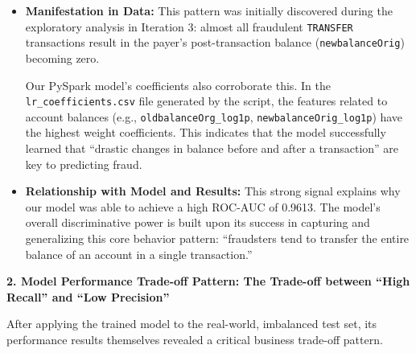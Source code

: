 \documentclass[sigplan,screen]{acmart}
\begin{document}
\begin{itemize}
\item \textbf{Manifestation in Data:} This pattern was initially discovered during the exploratory analysis in Iteration 3: almost all fraudulent \texttt{TRANSFER} transactions result in the payer's post-transaction balance (\texttt{newbalanceOrig}) becoming zero.

Our PySpark model's coefficients also corroborate this. In the \texttt{lr\_coefficients.csv} file generated by the script, the features related to account balances (e.g., \texttt{oldbalanceOrg\_log1p}, \texttt{newbalanceOrig\_log1p}) have the highest weight coefficients. This indicates that the model successfully learned that ``drastic changes in balance before and after a transaction'' are key to predicting fraud.

\item \textbf{Relationship with Model and Results:} This strong signal explains why our model was able to achieve a high ROC-AUC of 0.9613. The model's overall discriminative power is built upon its success in capturing and generalizing this core behavior pattern: ``fraudsters tend to transfer the entire balance of an account in a single transaction.''
\end{itemize}

\textbf{2. Model Performance Trade-off Pattern: The Trade-off between ``High Recall'' and ``Low Precision''}

After applying the trained model to the real-world, imbalanced test set, its performance results themselves revealed a critical business trade-off pattern.
\end{document}
